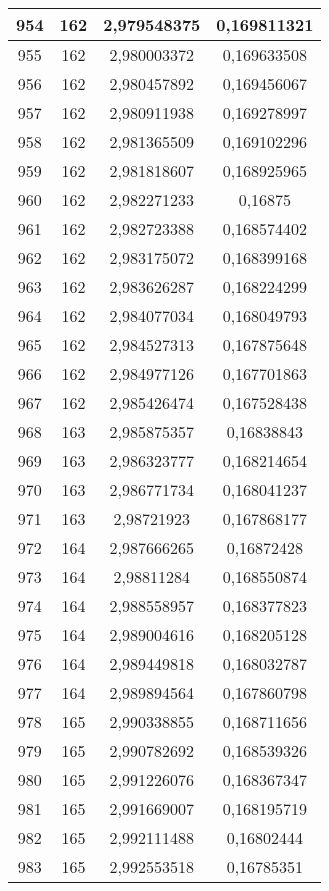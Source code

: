 {\begin{minipage}[!h]{0.45\textwidth}
\begin{longtable}{cccc}
954 & 162 & 2,979548375 & 0,169811321 \\ \hline
955 & 162 & 2,980003372 & 0,169633508 \\ \hline
956 & 162 & 2,980457892 & 0,169456067 \\ \hline
957 & 162 & 2,980911938 & 0,169278997 \\ \hline
958 & 162 & 2,981365509 & 0,169102296 \\ \hline
959 & 162 & 2,981818607 & 0,168925965 \\ \hline
960 & 162 & 2,982271233 & 0,16875 \\ \hline
961 & 162 & 2,982723388 & 0,168574402 \\ \hline
962 & 162 & 2,983175072 & 0,168399168 \\ \hline
963 & 162 & 2,983626287 & 0,168224299 \\ \hline
964 & 162 & 2,984077034 & 0,168049793 \\ \hline
965 & 162 & 2,984527313 & 0,167875648 \\ \hline
966 & 162 & 2,984977126 & 0,167701863 \\ \hline
967 & 162 & 2,985426474 & 0,167528438 \\ \hline
968 & 163 & 2,985875357 & 0,16838843 \\ \hline
969 & 163 & 2,986323777 & 0,168214654 \\ \hline
970 & 163 & 2,986771734 & 0,168041237 \\ \hline
971 & 163 & 2,98721923 & 0,167868177 \\ \hline
972 & 164 & 2,987666265 & 0,16872428 \\ \hline
973 & 164 & 2,98811284 & 0,168550874 \\ \hline
974 & 164 & 2,988558957 & 0,168377823 \\ \hline
975 & 164 & 2,989004616 & 0,168205128 \\ \hline
976 & 164 & 2,989449818 & 0,168032787 \\ \hline
977 & 164 & 2,989894564 & 0,167860798 \\ \hline
978 & 165 & 2,990338855 & 0,168711656 \\ \hline
979 & 165 & 2,990782692 & 0,168539326 \\ \hline
980 & 165 & 2,991226076 & 0,168367347 \\ \hline
981 & 165 & 2,991669007 & 0,168195719 \\ \hline
982 & 165 & 2,992111488 & 0,16802444 \\ \hline
983 & 165 & 2,992553518 & 0,16785351 \\ \hline

\end{longtable}
\end{minipage}}
